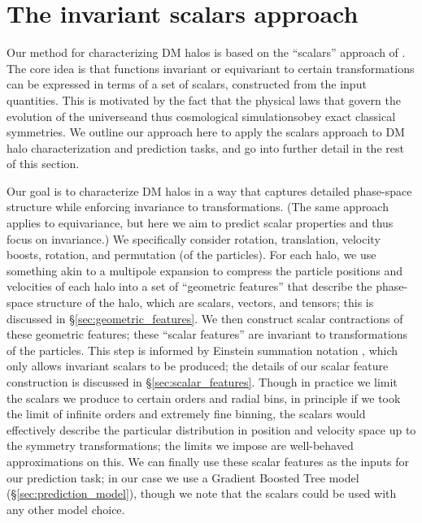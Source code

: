 \section{The invariant scalars approach}
\label{sec:scalars_approach}

Our method for characterizing DM halos is based on the ``scalars'' approach of \cite{Villar2021a}.
The core idea is that functions invariant or equivariant to certain transformations can be expressed in terms of a set of scalars, constructed from the input quantities.  
This is motivated by the fact that the physical laws that govern the evolution of the universe{\emdash}and thus cosmological simulations{\emdash}obey exact classical symmetries.
We outline our approach here to apply the scalars approach to DM halo characterization and prediction tasks, and go into further detail in the rest of this section.

Our goal is to characterize DM halos in a way that captures detailed phase-space structure while enforcing invariance to transformations.
(The same approach applies to equivariance, but here we aim to predict scalar properties and thus focus on invariance.)
We specifically consider rotation, translation, velocity boosts, rotation, and permutation (of the particles).
For each \dark halo, we use something akin to a multipole expansion to compress the particle positions and velocities of each halo into a set of ``geometric features'' that describe the phase-space structure of the halo, which are scalars, vectors, and tensors; this is discussed in \S\ref{sec:geometric_features}.
We then construct scalar contractions of these geometric features; these ``scalar features'' are invariant to transformations of the particles. 
This step is informed by Einstein summation notation \citep{einstein}, which only allows invariant scalars to be produced; the details of our scalar feature construction is discussed in \S\ref{sec:scalar_features}.
Though in practice we limit the scalars we produce to certain orders and radial bins, in principle if we took the limit of infinite orders and extremely fine binning, the scalars would effectively describe the particular distribution in position and velocity space up to the symmetry transformations; the limits we impose are well-behaved approximations on this.
We can finally use these scalar features as the inputs for our prediction task; in our case we use a Gradient Boosted Tree model (\S\ref{sec:prediction_model}), though we note that the scalars could be used with any other model choice.


